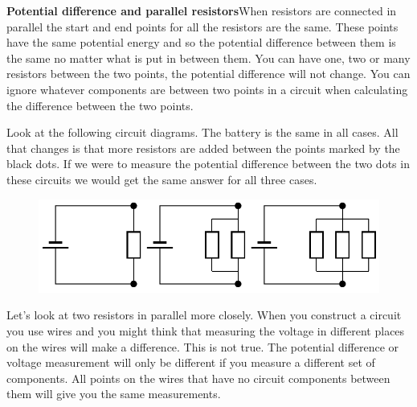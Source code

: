           \par 
        \label{m38776*id64009}\noindent{}\textbf{Potential difference and parallel resistors}When resistors are connected in parallel the start and end points for all the resistors are the same. These points have the same potential energy and so the potential difference between them is the same no matter what is put in between them. You can have one, two or many resistors between the two points, the potential difference will not change. You can ignore whatever components are between two points in a circuit when calculating the difference between the two points.\par 
        \label{m38776*id64017}Look at the following circuit diagrams. The battery is the same in all cases. All that changes is that more resistors are added between the points marked by the black dots. If we were to measure the potential difference between the two dots in these circuits we would get the same answer for all three cases.\par 
        \label{m38776*id64023}
    \setcounter{subfigure}{0}
	\begin{figure}[H] %
    \begin{center}
    \label{m38776*id64026!!!underscore!!!media}\label{m38776*id64026!!!underscore!!!printimage}\includegraphics[width=\columnwidth]{col11305.imgs/m38776_PG10C9_016.png} %
      \vspace{2pt}
    \vspace{.1in}
    \end{center}
 \end{figure}       
        \par 
        \label{m38776*id64033}Let's look at two resistors in parallel more closely. When you construct a circuit you use wires and you might think that measuring the voltage in different places on the wires will make a difference. This is not true. The potential difference or voltage measurement will only be different if you measure a different set of components. All points on the wires that have no circuit components between them will give you the same measurements.\par 
